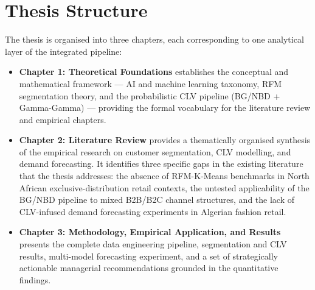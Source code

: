\section*{Thesis Structure}

The thesis is organised into three chapters, each corresponding to one analytical layer of the integrated pipeline:

\begin{itemize}[noitemsep]
    \item \textbf{Chapter 1: Theoretical Foundations} establishes the conceptual and mathematical framework — AI and machine learning taxonomy, RFM segmentation theory, and the probabilistic CLV pipeline (BG/NBD + Gamma-Gamma) — providing the formal vocabulary for the literature review and empirical chapters.

    \item \textbf{Chapter 2: Literature Review} provides a thematically organised synthesis of the empirical research on customer segmentation, CLV modelling, and demand forecasting. It identifies three specific gaps in the existing literature that the thesis addresses: the absence of RFM-K-Means benchmarks in North African exclusive-distribution retail contexts, the untested applicability of the BG/NBD pipeline to mixed B2B/B2C channel structures, and the lack of CLV-infused demand forecasting experiments in Algerian fashion retail.

    \item \textbf{Chapter 3: Methodology, Empirical Application, and Results} presents the complete data engineering pipeline, segmentation and CLV results, multi-model forecasting experiment, and a set of strategically actionable managerial recommendations grounded in the quantitative findings.
\end{itemize}